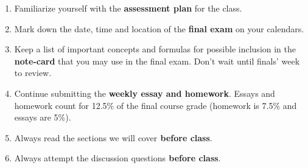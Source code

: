 \documentclass[12pt,dvipsnames]{article}
\begin{document}
 \begin{mdframed}[style=exampledefault,linecolor=red,linewidth=5pt,roundcorner=5pt,frametitle={Looking ahead to the conclusion of the course...}]

\begin{enumerate}[label= {  \arabic*:},labelindent=2em, style = standard,leftmargin=4pc, labelsep=*, noitemsep]
 		\item Familiarize yourself with the {\bf{assessment plan}} for the class.
\item Mark down the date, time and location of the {\bf{final exam}} on your calendars. 
\item Keep a list of important concepts and formulas for possible inclusion in the {\bf{note-card}} that you may use in the final exam. Don't wait until finals' week to review.
\item Continue submitting the {\bf{weekly essay and homework}}. Essays and homework count for 12.5\% of the final course grade (homework is 7.5\% and essays are 5\%).
\item Always read the sections we will cover{\bf{ before class}}.
\item Always attempt the discussion questions{\bf{ before class}}.
\end{enumerate}
 	\end{mdframed}
\end{document}
